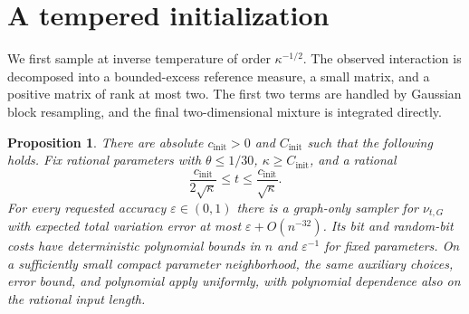 \documentclass[11pt]{article}
\newtheorem{proposition}[thm]{Proposition}
\numberwithin{equation}{section}
\begin{document}
\section{A tempered initialization}\label{tp:initialization}

We first sample at inverse temperature of order $\kappa^{-1/2}$. The observed interaction is decomposed into a bounded-excess reference measure, a small matrix, and a positive matrix of rank at most two. The first two terms are handled by Gaussian block resampling, and the final two-dimensional mixture is integrated directly.

\begin{proposition}\label{tp:initializer}
There are absolute $c_{\mathrm{init}}>0$ and $C_{\mathrm{init}}$ such that the following holds. Fix rational parameters with $\theta\le1/30$, $\kappa\ge C_{\mathrm{init}}$, and a rational
\[
 \frac{c_{\mathrm{init}}}{2\sqrt\kappa}\le t\le
 \frac{c_{\mathrm{init}}}{\sqrt\kappa}.
\]
For every requested accuracy $\varepsilon\in(0,1)$ there is a graph-only sampler for $\nu_{t,G}$ with expected total variation error at most $\varepsilon+O(n^{-32})$. Its bit and random-bit costs have deterministic polynomial bounds in $n$ and $\varepsilon^{-1}$ for fixed parameters. On a sufficiently small compact parameter neighborhood, the same auxiliary choices, error bound, and polynomial apply uniformly, with polynomial dependence also on the rational input length.
\end{proposition}
\end{document}
